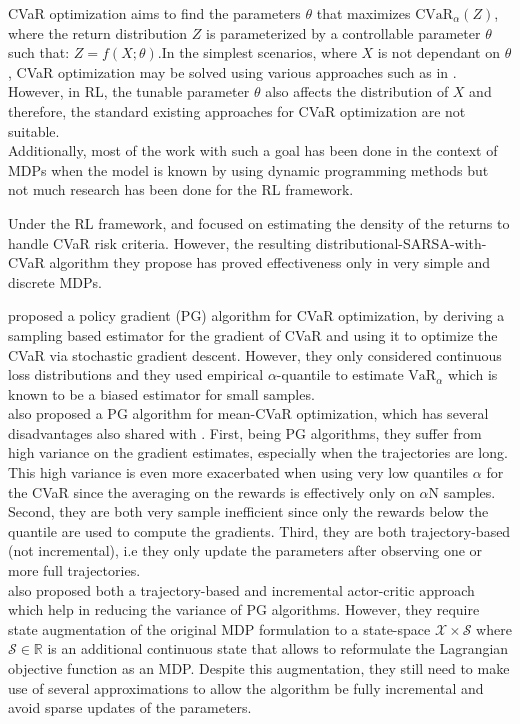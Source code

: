 CVaR optimization aims to find the parameters $\theta$ that maximizes 
$\text{CVaR}_\alpha (Z)$, where the return distribution $Z$ is parameterized by a 
controllable parameter $\theta$ such that: $Z = f(X; \theta)$.In the simplest scenarios, 
where $X$ is not dependant on $\theta$, CVaR optimization may 
be solved using various approaches such as in \citet{Rockafellar2000}.\\
However, in RL, the tunable parameter $\theta$ also affects the 
distribution of $X$ and therefore, the standard existing approaches for CVaR optimization 
are not suitable.\\
Additionally, most of the work with such a goal has been done in the context of MDPs when
the model is known  by using dynamic programming methods \citep{Chow2015, Petrik2012}
but not much research has been done for the RL framework.

Under the RL framework, \citet{Morimura2010a} and \citet{Morimura2010b}
focused on estimating the density of the returns
to handle CVaR risk criteria. However, the resulting distributional-SARSA-with-CVaR algorithm
they propose has  proved  effectiveness  only  in  very simple  and discrete MDPs.

\citet{Tamar2015a} proposed a policy gradient (PG) algorithm for CVaR optimization, by
deriving a sampling based estimator for the gradient of CVaR and using it to optimize the
CVaR via stochastic gradient descent. However, they only considered continuous loss distributions
and they used empirical $\alpha$-quantile to estimate 
$\text{VaR}_\alpha$ which is known to be a biased estimator for small samples.\\
\citet{Chow2014} also proposed a PG algorithm for mean-CVaR optimization, which has several
disadvantages also shared with \citet{Tamar2015}. First, being PG algorithms,
they suffer from high variance on the gradient estimates, especially when the trajectories
are long. This high variance is even more exacerbated when using very low quantiles $\alpha$ for the CVaR 
since the averaging on the rewards is effectively only on $\alpha$N samples.
Second, they are both very sample inefficient since only the rewards below the quantile
are used to compute the gradients. Third, they are both trajectory-based (not incremental), 
i.e they only update the parameters after observing one or more full trajectories.\\
\citet{Chow2014} also proposed both a trajectory-based and incremental actor-critic
approach which help in reducing the variance of PG algorithms. However, they require
state augmentation of the original MDP formulation to a state-space
$\mathcal{X} \times \mathcal{S}$ where $\mathcal{S} \in \mathbb R$ is an additional continuous
state that allows to reformulate the Lagrangian objective function as an MDP. Despite this augmentation,
they still need to make use of several approximations to allow the algorithm be fully incremental and 
avoid sparse updates of the parameters. 

